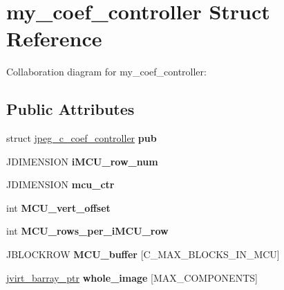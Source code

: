 \hypertarget{structmy__coef__controller}{\section{my\+\_\+coef\+\_\+controller Struct Reference}
\label{structmy__coef__controller}
}


Collaboration diagram for my\+\_\+coef\+\_\+controller\+:
\subsection*{Public Attributes}
\begin{DoxyCompactItemize}
\item 
\hypertarget{structmy__coef__controller_a5585d883f38ce6d73d0d2fb31457f4e5}{struct \hyperlink{structjpeg__c__coef__controller}{jpeg\+\_\+c\+\_\+coef\+\_\+controller} {\bfseries pub}}\label{structmy__coef__controller_a5585d883f38ce6d73d0d2fb31457f4e5}

\item 
\hypertarget{structmy__coef__controller_aebf2f540f71a3af44f75544ef474badb}{J\+D\+I\+M\+E\+N\+S\+I\+O\+N {\bfseries i\+M\+C\+U\+\_\+row\+\_\+num}}\label{structmy__coef__controller_aebf2f540f71a3af44f75544ef474badb}

\item 
\hypertarget{structmy__coef__controller_adfe2cbcbfc3c4760874392d8488d88fd}{J\+D\+I\+M\+E\+N\+S\+I\+O\+N {\bfseries mcu\+\_\+ctr}}\label{structmy__coef__controller_adfe2cbcbfc3c4760874392d8488d88fd}

\item 
\hypertarget{structmy__coef__controller_a47e8d96f30f813289b02267601c4a7b4}{int {\bfseries M\+C\+U\+\_\+vert\+\_\+offset}}\label{structmy__coef__controller_a47e8d96f30f813289b02267601c4a7b4}

\item 
\hypertarget{structmy__coef__controller_a11bc55a8487bfdd201d2ca756d132023}{int {\bfseries M\+C\+U\+\_\+rows\+\_\+per\+\_\+i\+M\+C\+U\+\_\+row}}\label{structmy__coef__controller_a11bc55a8487bfdd201d2ca756d132023}

\item 
\hypertarget{structmy__coef__controller_a9eac536791caff80d2c99c204237b0ee}{J\+B\+L\+O\+C\+K\+R\+O\+W {\bfseries M\+C\+U\+\_\+buffer} \mbox{[}C\+\_\+\+M\+A\+X\+\_\+\+B\+L\+O\+C\+K\+S\+\_\+\+I\+N\+\_\+\+M\+C\+U\mbox{]}}\label{structmy__coef__controller_a9eac536791caff80d2c99c204237b0ee}

\item 
\hypertarget{structmy__coef__controller_aedc0b0cdda57a7f9e8c49770995b12b4}{\hyperlink{structjvirt__barray__control}{jvirt\+\_\+barray\+\_\+ptr} {\bfseries whole\+\_\+image} \mbox{[}M\+A\+X\+\_\+\+C\+O\+M\+P\+O\+N\+E\+N\+T\+S\mbox{]}}\label{structmy__coef__controller_aedc0b0cdda57a7f9e8c49770995b12b4}


\end{DoxyCompactItemize}
